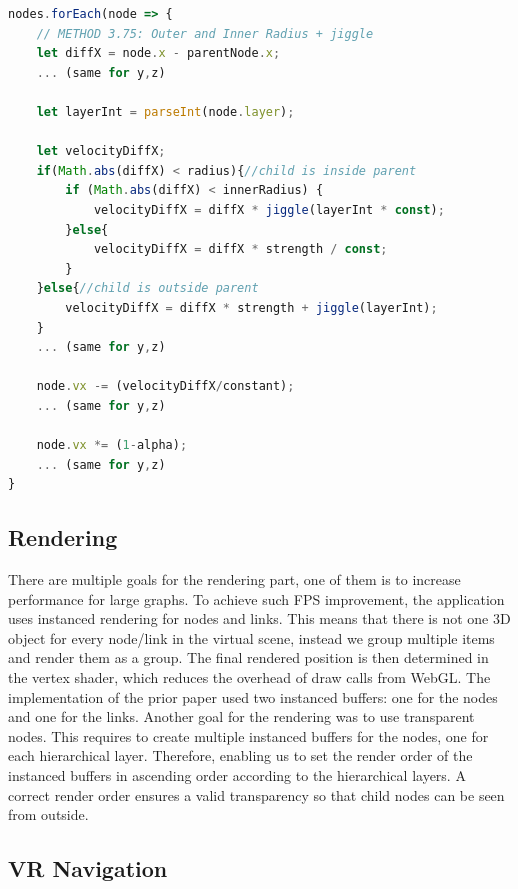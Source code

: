 \begin{lstlisting}[language=JavaScript,label={lst:sphericalConstraint},caption=Simplified algorithm for the spherical constraint. We apply adapted velocities whenever the child node is inside the parent. In addition we further determine if the childnode is already inside an closer radius or not.] 
nodes.forEach(node => {
    // METHOD 3.75: Outer and Inner Radius + jiggle
    let diffX = node.x - parentNode.x;
    ... (same for y,z)

    let layerInt = parseInt(node.layer);

    let velocityDiffX;
    if(Math.abs(diffX) < radius){//child is inside parent
        if (Math.abs(diffX) < innerRadius) {
            velocityDiffX = diffX * jiggle(layerInt * const);
        }else{
            velocityDiffX = diffX * strength / const;
        } 
    }else{//child is outside parent
        velocityDiffX = diffX * strength + jiggle(layerInt);
    }
    ... (same for y,z)

    node.vx -= (velocityDiffX/constant);
    ... (same for y,z)

    node.vx *= (1-alpha);
    ... (same for y,z)
}
\end{lstlisting}

\subsection{Rendering}
\label{sec:rendering}

There are multiple goals for the rendering part, one of them is to increase performance for large graphs. 
To achieve such FPS improvement, the application uses instanced rendering for nodes and links. This means that there is not one 3D object for every node/link in the virtual scene, instead we group multiple items and render them as a group. The final rendered position is then determined in the vertex shader, which reduces the overhead of draw calls from WebGL.
The implementation of the prior paper used two instanced buffers: one for the nodes and one for the links. 
Another goal for the rendering was to use transparent nodes. This requires to create multiple instanced buffers for the nodes, one for each hierarchical layer. 
Therefore, enabling us to set the render order of the instanced buffers in ascending order according to the hierarchical layers. A correct render order ensures  a valid transparency so that child nodes can be seen from outside.

\subsection{VR Navigation}
\label{sec:vrInteractions}

